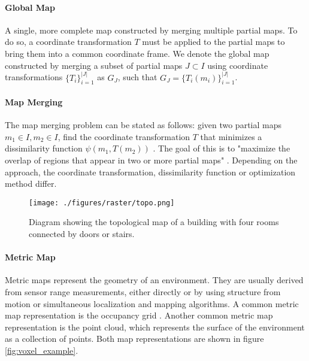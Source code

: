 \paragraph{Global Map} A single, more complete map constructed by merging multiple partial maps. To do so, a coordinate transformation \(T\) must be applied to the partial maps to bring them into a common coordinate frame. We denote the global map constructed by merging a subset of partial maps \(J \subset I\) using coordinate transformations \(\{T_i\}_{i=1}^{|J|}\) as \(G_J\), such that \(G_J=\{T_i(m_i)\}_{i=1}^{|J|}\).

\paragraph{Map Merging} The map merging problem can be stated as follows: given two partial maps \(m_1\in I, m_2\in I\), find the coordinate transformation \(T\) that minimizes a dissimilarity function \(\psi(m_1,T(m_2))\) \citep{carpin_map_2005}. The goal of this is to "maximize the overlap of regions that appear in two or more partial maps" \citep{carpin_map_2005}. Depending on the approach, the coordinate transformation, dissimilarity function or optimization method differ.

\begin{figure}[h]
    \centering
    \texttt{[image: ./figures/raster/topo.png]}
    \caption{Diagram showing the topological map of a building with four rooms connected by doors or stairs.}
    \label{fig:topo_ex}
\end{figure}

\paragraph{Metric Map} Metric maps represent the geometry of an environment. They are usually derived from sensor range measurements, either directly or by using structure from motion or simultaneous localization and mapping algorithms. A common metric map representation is the occupancy grid \citep{andersone_heterogeneous_2019}. Another common metric map representation is the point cloud, which represents the surface of the environment as a collection of points. Both map representations are shown in figure \ref{fig:voxel_example}.

